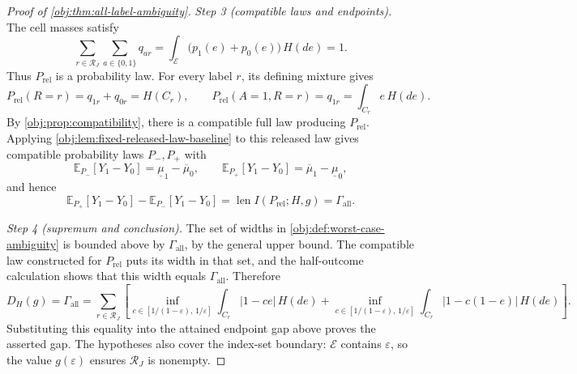\begin{proof}[Proof of \cref{obj:thm:all-label-ambiguity}]
\textit{Step 3 (compatible laws and endpoints).}
The cell masses satisfy
\[
\sum_{r\in\mathcal R_J}\sum_{a\in\{0,1\}}q_{ar}
=\int_{\mathcal E}\bigl(p_1(e)+p_0(e)\bigr)\,H(de)=1.
\]
Thus \(P_{\mathrm{rel}}\) is a probability law. For every label \(r\), its defining mixture gives
\[
P_{\mathrm{rel}}(R=r)=q_{1r}+q_{0r}=H(C_r),
\qquad
P_{\mathrm{rel}}(A=1,R=r)=q_{1r}
=\int_{C_r}e\,H(de).
\]
By \cref{obj:prop:compatibility}, there is a compatible full law producing \(P_{\mathrm{rel}}\). Applying \cref{obj:lem:fixed-released-law-baseline} to this released law gives compatible probability laws \(P_-,P_+\) with
\[
\mathbb E_{P_-}[Y_1-Y_0]=\underline\mu_1-\overline\mu_0,
\qquad
\mathbb E_{P_+}[Y_1-Y_0]=\overline\mu_1-\underline\mu_0,
\]
and hence
\[
\mathbb E_{P_+}[Y_1-Y_0]-\mathbb E_{P_-}[Y_1-Y_0]
=\operatorname{len}I(P_{\mathrm{rel}};H,g)
=\Gamma_{\mathrm{all}}.
\]

\textit{Step 4 (supremum and conclusion).}
The set of widths in \cref{obj:def:worst-case-ambiguity} is bounded above by \(\Gamma_{\mathrm{all}}\), by the general upper bound. The compatible law constructed for \(P_{\mathrm{rel}}\) puts its width in that set, and the half-outcome calculation shows that this width equals \(\Gamma_{\mathrm{all}}\). Therefore
\[
D_H(g)=\Gamma_{\mathrm{all}}
=\sum_{r\in\mathcal R_J}\left[
\inf_{c\in[1/(1-\varepsilon),\,1/\varepsilon]}
 \int_{C_r}|1-ce|\,H(de)
+
\inf_{c\in[1/(1-\varepsilon),\,1/\varepsilon]}
 \int_{C_r}|1-c(1-e)|\,H(de)
\right].
\]
Substituting this equality into the attained endpoint gap above proves the asserted gap. The hypotheses also cover the index-set boundary: \(\mathcal E\) contains \(\varepsilon\), so the value \(g(\varepsilon)\) ensures \(\mathcal R_J\) is nonempty.
\end{proof}

